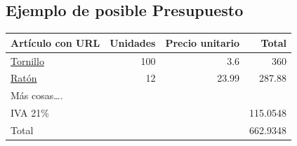 \documentclass{article}
\begin{document}
\subsection{Ejemplo de posible Presupuesto}
\label{sec:org0000012}
\begin{center}
\begin{tabular}{lrrr}
Artículo con URL & Unidades & Precio unitario & Total\\
\hline
\href{https://www.tornillos-online.com/975a2es.html}{Tornillo} & 100 & 3.6 & 360\\
\href{https://www.pccomponentes.com/hp-pavilion-200-raton-gaming-3200-dpi}{Ratón} & 12 & 23.99 & 287.88\\
Más cosas\ldots{}. &  &  & \\
\hline
IVA 21\% &  &  & 115.0548\\
Total &  &  & 662.9348\\
\hline
\end{tabular}
\end{center}
\end{document}
